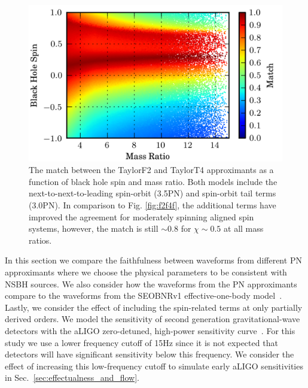 \begin{figure}
\begin{center}
\includegraphics{papers/nsbh_faithfulness/figure3.png}
\end{center}
\caption{\label{fig:f2t4fso}The match between the TaylorF2 and TaylorT4 approximants
as a function of black hole spin and mass ratio. Both models include
the next-to-next-to-leading spin-orbit (3.5\ac{PN}) and spin-orbit tail 
terms (3.0\ac{PN}). In comparison to Fig. \ref{fig:f2f4f}, the additional terms have 
improved the agreement for moderately spinning aligned spin systems, however, the
match is still $ \sim 0.8 $ for $\chi \sim 0.5 $ at all mass ratios.}

\end{figure}



In this section we compare the faithfulness between waveforms from different
\ac{PN} approximants where we choose the physical parameters to be consistent
with \ac{NSBH} sources.  We also consider how the waveforms from the \ac{PN}
approximants compare to the waveforms from the SEOBNRv1 effective-one-body
model~\cite{Taracchini:2012ig}. Lastly, we consider the effect of including 
the spin-related terms at only partially derived orders. 
We model the sensitivity of second generation  gravitational-wave detectors with the aLIGO
zero-detuned, high-power sensitivity curve~\cite{aLIGOSensCurves}. For this
study we use a lower frequency cutoff of 15Hz since it is not expected that
detectors will have significant sensitivity below this frequency. We consider
the effect of increasing this low-frequency cutoff to simulate early aLIGO
sensitivities in Sec.~\ref{sec:effectualness_and_flow}.

